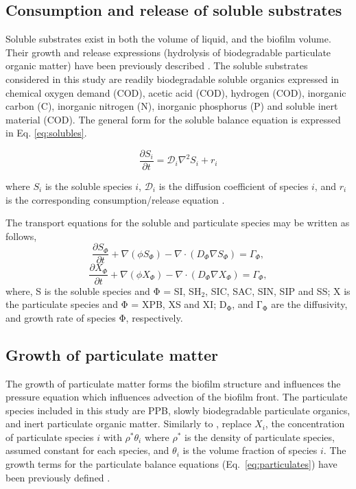 \subsection{Consumption and release of soluble substrates}
Soluble substrates exist in both the volume of liquid, and the biofilm volume. Their growth and release expressions (hydrolysis of biodegradable particulate organic matter) have been previously described \cite{puyol2017}. The soluble substrates considered in this study are readily biodegradable soluble organics expressed in chemical oxygen demand (COD), acetic acid (COD), hydrogen (COD), inorganic carbon (C), inorganic nitrogen (N), inorganic phosphorus (P) and soluble inert material (COD). The general form for the soluble balance equation is expressed in Eq. \ref{eq:solubles}.

\begin{equation}
\label{eq:solubles}
\frac{\partial S_i}{\partial t} = \mathcal{D}_i\nabla^2 S_i + r_{i}
\end{equation}

where $S_i$ is the soluble species $i$, $\mathcal{D}_i$ is the diffusion coefficient of species $i$, and $r_i$ is the corresponding consumption/release equation \cite{puyol2017}.

The transport equations for the soluble and particulate species may be written as follows,
\begin{equation}
\label{eq:solublesD}
\frac{\partial S_{\Phi}}{\partial t} + \nabla (\phi S_{\Phi}) - \nabla \cdot (D_{\Phi} \nabla S_{\Phi}) = \Gamma_{\Phi}, 
\end{equation}
\begin{equation}
\label{eq:particulate}
\frac{\partial X_{\Phi}}{\partial t} + \nabla (\phi X_{\Phi}) - \nabla \cdot (D_{\Phi} \nabla X_{\Phi}) = \Gamma_{\Phi}, 
\end{equation}
where, S is the soluble species and $\mathrm{\Phi}$ = SI, SH$\mathrm{_2}$, SIC, SAC, SIN, SIP and SS; X is the particulate species and $\mathrm{\Phi}$ = XPB, XS and XI; $\mathrm{D_{\Phi}}$, and $\mathrm{\Gamma_{\Phi}}$ are the diffusivity, and growth rate of species $\mathrm{\Phi}$, respectively.  


\subsection{Growth of particulate matter}
The growth of particulate matter forms the biofilm structure and influences the pressure equation which influences advection of the biofilm front. The particulate species included in this study are PPB, slowly biodegradable particulate organics, and inert particulate organic matter. Similarly to \cite{alpkvist2007}, replace $X_i$, the concentration of particulate species $i$ with $\rho^*\theta_i$ where $\rho^*$ is the density of particulate species, assumed constant for each species, and $\theta_i$ is the volume fraction of species $i$. The growth terms for the particulate balance equations (Eq.~\ref{eq:particulates}) have been previously defined \cite{puyol2017}.


